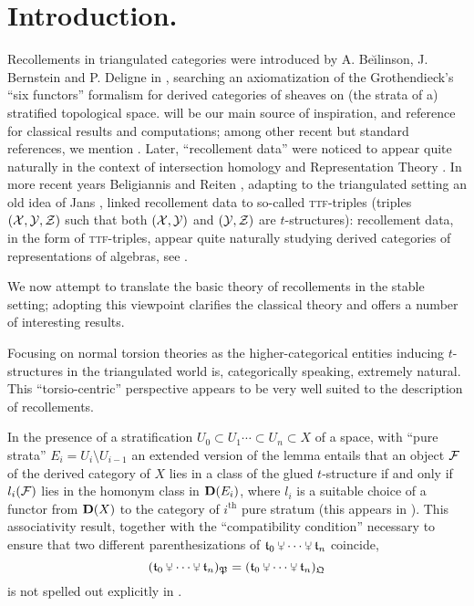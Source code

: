 \section{Introduction.}
Recollements in triangulated categories were introduced by A\@. Be\u{\i}linson,  J\@. Bernstein and P\@. Deligne in \cite{BBDPervers}, searching an axiomatization of the Grothendieck's ``six functors'' formalism for derived categories of sheaves on (the strata of a) stratified topological space. \cite{BBDPervers} will be our main source of inspiration, and reference for classical results and computations; among other recent but standard references, we mention \cite{Kashiwara,Banagl}. Later, ``recollement data'' were noticed to appear quite naturally in the context of intersection homology \cite{pflaum2001analytic,goresky1980intersection,goresky1983intersection} and Representation Theory \cite{parshall1988derived,kiehl2001weil}. In more recent years Beligiannis and Reiten \cite{Beligiannisreiten}, adapting to the triangulated setting an old idea of Jans \cite{jans1965}, linked recollement data to so\hyp{}called \textsc{ttf}\hyp{}triples (\ie triples $(\mathcal{X}, \mathcal{Y}, \mathcal{Z})$ such that both $(\mathcal{X}, \mathcal{Y})$ and $(\mathcal{Y}, \mathcal{Z})$ are $t$\hyp{}structures): recollement data, in the form of \textsc{ttf}\hyp{}triples, appear quite naturally studying derived categories of representations of algebras, see \cite[ \textbf{4}]{Beligiannisreiten}.

We now attempt to translate the basic theory of recollements in the stable setting; adopting this viewpoint clarifies the classical theory and offers a number of interesting results. 

Focusing on normal torsion theories as the higher\hyp{}categorical entities inducing $t$\hyp{}structures in the triangulated world is, categorically speaking, extremely natural. This ``torsio\hyp{}centric'' perspective appears to be very well suited to the description of recollements.

In the presence of a stratification $U_0\subset U_1\cdots\subset U_n\subset X$ of a space, with ``pure strata'' $E_i = U_i\setminus U_{i-1}$ an extended version of the \ror lemma entails that an object $\mathcal{F}$ of the derived category of $X$ lies in a class of the glued $t$\hyp{}structure if and only if $l_i(\mathcal{F})$ lies in the homonym class in $\mathbf{D}(E_i)$, where $l_i$ is a suitable choice of a functor from $\mathbf{D}(X)$ to the category of $i^\text{th}$ pure stratum (this appears in ). This associativity result, together with the ``compatibility condition'' necessary to ensure that two different parenthesizations of $\tee_0 \glue \cdots \glue \tee_n$ coincide,
\[
(\tee_0 \glue \cdots \glue \tee_n)_{\mathfrak{P}} = (\tee_0 \glue \cdots \glue \tee_n)_{\mathfrak{Q}}
\]
is not spelled out explicitly in \cite{BBDPervers}. 


